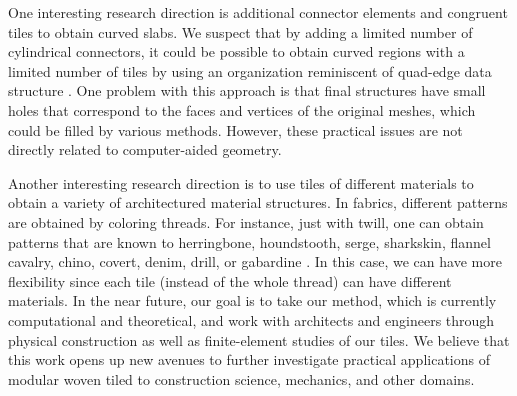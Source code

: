 \documentclass[times,twocolumn,final]{elsarticle}
\begin{document}
One interesting research direction is additional connector elements and congruent tiles to obtain curved slabs. We suspect that by adding a limited number of cylindrical connectors, it could be possible to obtain curved regions with a limited number of tiles by using an organization reminiscent of quad-edge data structure \cite{akleman2016construction}. One problem with this approach is that final structures have small holes that correspond to the faces and vertices of the original meshes, which could be filled by various methods. However, these practical issues are not directly related to computer-aided geometry. 



 {Another interesting research direction is to use tiles of different materials to obtain a variety of architectured material structures. In fabrics, different patterns are obtained by coloring threads. For instance, just with twill, one can obtain patterns that are known to herringbone, houndstooth, serge, sharkskin, flannel cavalry, chino, covert, denim, drill, or gabardine \cite{feijs2012houndstooth, Windeknecht1980, Windeknecht1994}. In this case, we can have more flexibility since each tile (instead of the whole thread) can have different materials. In the near future, our goal is to take our method, which is currently computational and theoretical, and work with architects and engineers through physical construction as well as finite-element studies of our tiles. We believe that this work opens up new avenues to further investigate practical applications of modular woven tiled to construction science, mechanics, and other domains.}



\end{document}

